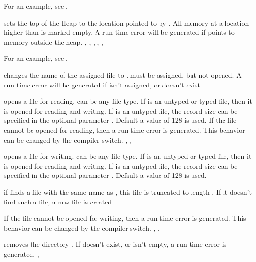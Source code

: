 \documentclass{report}
\begin{document}
For an example, see .

{ sets the top of the Heap to the location pointed to by
. All memory at a location higher than  is marked empty.}
{A run-time error will be generated if  points to memory outside the
heap.}
{, , , , 
, }

For an example, see .

{ changes the name of the assigned file  to .
must be assigned, but not opened.}
{A run-time error will be generated if  isn't assigned, 
or doesn't exist.}
{}



{ opens a file  for reading.  can be any file type.
If  is an untyped or typed file, then it is opened for reading and 
writing. If  is an untyped file, the record size can be specified in 
the optional parameter . Default a value of 128 is used.}
{If the file cannot be opened for reading, then a run-time error is
generated. This behavior can be changed by the  compiler switch.}
{, , }




{ opens a file  for writing.  can be any file type.
If  is an untyped or typed file, then it is opened for reading and 
writing. If  is an untyped file, the record size can be specified in 
the optional parameter . Default a value of 128 is used.

if  finds a file with the same name as , this file is
truncated to length . If it doesn't find such a file, a new file is 
created.
}
{If the file cannot be opened for writing, then a run-time error is
generated. This behavior can be changed by the  compiler switch.}
{, , }




{ removes the  directory .}
{If  doesn't exist, or isn't empty, a run-time error is generated.
}
{, }
\end{document}
